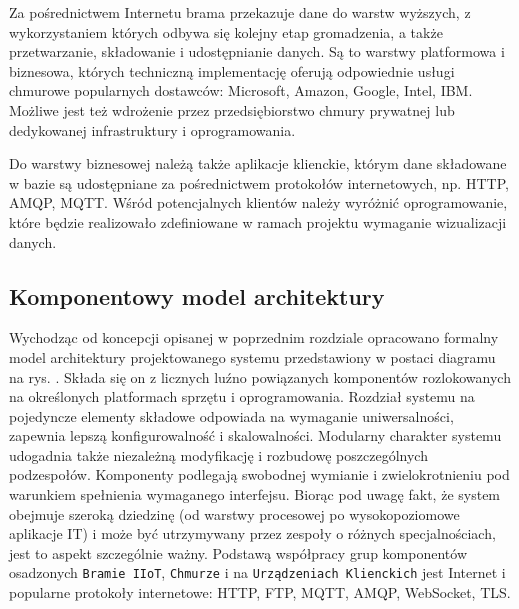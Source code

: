 \documentclass[a4paper, 12pt, twoside]{article}
\begin{document}
Za pośrednictwem Internetu brama
przekazuje dane do warstw wyższych, z wykorzystaniem których odbywa się kolejny etap gromadzenia,
a także przetwarzanie, składowanie i udostępnianie danych. Są to warstwy platformowa
i biznesowa, których techniczną implementację oferują odpowiednie usługi chmurowe
popularnych dostawców: Microsoft, Amazon, Google, Intel, IBM. Możliwe jest też
wdrożenie przez przedsiębiorstwo chmury prywatnej lub dedykowanej infrastruktury
i oprogramowania.

Do warstwy biznesowej należą także aplikacje klienckie, którym dane składowane
w bazie są udostępniane za pośrednictwem protokołów
internetowych, np. HTTP, AMQP, MQTT. Wśród potencjalnych klientów należy wyróżnić
oprogramowanie, które będzie realizowało zdefiniowane w ramach projektu wymaganie wizualizacji
danych.

\subsection{Komponentowy model architektury}

Wychodząc od koncepcji opisanej w poprzednim rozdziale opracowano
formalny model architektury projektowanego systemu przedstawiony
w postaci diagramu na rys. . Składa się on z licznych luźno
powiązanych komponentów rozlokowanych na określonych platformach sprzętu i oprogramowania.
Rozdział systemu na pojedyncze elementy składowe odpowiada na wymaganie uniwersalności, zapewnia
lepszą konfigurowalność i skalowalności. Modularny charakter systemu
udogadnia także niezależną modyfikację i rozbudowę poszczególnych podzespołów.
Komponenty podlegają swobodnej wymianie
i zwielokrotnieniu pod warunkiem spełnienia wymaganego interfejsu.
Biorąc pod uwagę fakt, że system obejmuje szeroką dziedzinę (od warstwy procesowej
po wysokopoziomowe aplikacje IT) i może być utrzymywany przez zespoły o różnych
specjalnościach, jest to aspekt szczególnie ważny. Podstawą współpracy
grup komponentów osadzonych \texttt{Bramie IIoT}, \texttt{Chmurze} i na
\texttt{Urządzeniach Klienckich} jest
Internet i popularne protokoły internetowe: HTTP, FTP, MQTT, AMQP, WebSocket, TLS.
\end{document}
